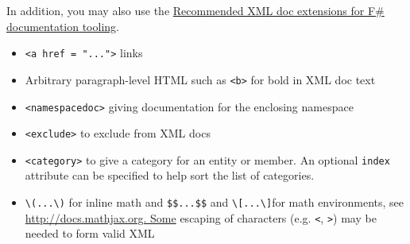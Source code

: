 \documentclass{article}
\begin{document}
In addition, you may also use the \href{https://github.com/fsharp/fslang-design/blob/master/tooling/FST-1031-xmldoc-extensions.md}{Recommended XML doc extensions for F\# documentation tooling}.
\begin{itemize}
\item 

\texttt{<a href = "...">} links

\item 

Arbitrary paragraph-level HTML such as \texttt{<b>} for bold in XML doc text

\item 

\texttt{<namespacedoc>} giving documentation for the enclosing namespace

\item 

\texttt{<exclude>} to exclude from XML docs

\item 

\texttt{<category>} to give a category for an entity or member. An optional \texttt{index} attribute can be specified
to help sort the list of categories.

\item 

\texttt{{\textbackslash}(...{\textbackslash})} for inline math and \texttt{\$\$...\$\$} and \texttt{{\textbackslash}[...{\textbackslash}]}for math environments, see \href{http://docs.mathjax.org.
Some}{http://docs.mathjax.org.
Some} escaping of characters (e.g. \texttt{<}, \texttt{>}) may be needed to form valid XML

\end{itemize}
\end{document}
